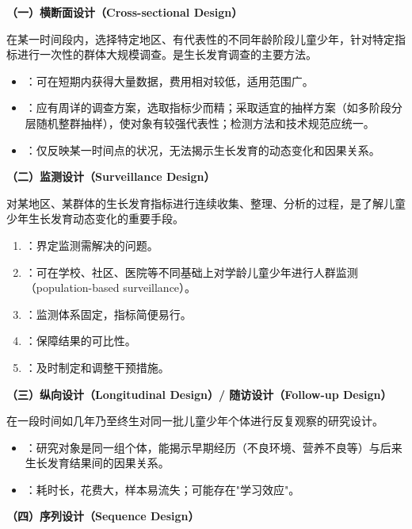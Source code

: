\begin{keybox}
\textbf{（一）横断面设计（Cross-sectional Design）}

在某一时间段内，选择特定地区、有代表性的不同年龄阶段儿童少年，针对特定指标进行一次性的群体大规模调查。是生长发育调查的主要方法。

\begin{itemize}[leftmargin=*]
    \item {}：可在短期内获得大量数据，费用相对较低，适用范围广。
    \item {}：应有周详的调查方案，选取指标少而精；采取适宜的抽样方案（如多阶段分层随机整群抽样），使对象有较强代表性；检测方法和技术规范应统一。
    \item {}：仅反映某一时间点的状况，无法揭示生长发育的动态变化和因果关系。
\end{itemize}

\textbf{（二）监测设计（Surveillance Design）}

对某地区、某群体的生长发育指标进行连续收集、整理、分析的过程，是了解儿童少年生长发育动态变化的重要手段。

\begin{enumerate}[leftmargin=*]
    \item {}：界定监测需解决的问题。
    \item {}：可在学校、社区、医院等不同基础上对学龄儿童少年进行人群监测（population-based surveillance）。
    \item {}：监测体系固定，指标简便易行。
    \item {}：保障结果的可比性。
    \item {}：及时制定和调整干预措施。
\end{enumerate}

\textbf{（三）纵向设计（Longitudinal Design）/ 随访设计（Follow-up Design）}

在一段时间如几年乃至终生对同一批儿童少年个体进行反复观察的研究设计。

\begin{itemize}[leftmargin=*]
    \item {}：研究对象是同一组个体，能揭示早期经历（不良环境、营养不良等）与后来生长发育结果间的因果关系。
    \item {}：耗时长，花费大，样本易流失；可能存在"学习效应"。
\end{itemize}

\textbf{（四）序列设计（Sequence Design）}


\end{keybox}
